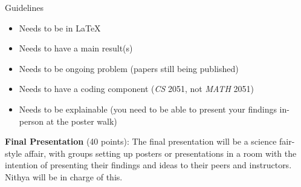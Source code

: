 \documentclass{article}
\begin{document}
\begin{itemize}
    
Guidelines
\begin{itemize}
    \item Needs to be in \LaTeX
    \item Needs to have a main result(s)
    \item Needs to be ongoing problem (papers still being published)
    \item Needs to have a coding component (\textit{CS} 2051, not \textit{MATH} 2051)
    \item Needs to be explainable (you need to be able to present your findings in-person at the poster walk)
\end{itemize}
    

    \textbf{Final Presentation} (40 points): The final presentation will be a science fair-style affair, with groups setting up posters or presentations in a room with the intention of presenting their findings and ideas to their peers and instructors. Nithya will be in charge of this.
\end{itemize}
\end{document}
